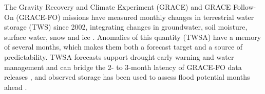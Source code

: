 \documentclass[hess, manuscript]{copernicus}
\begin{document}
\begin{abstract}
differ significantly from the filter's. None of the nonlinear models
tested on the same inputs has lower error than this ridge at 1 to 3
months. Both the filter and damped persistence have lower
standardized error at 1 month than GRACE-FCast, a published deep-learning
hindcast, when each is scored on the same mascon product and on the fully
covered basins. GRACE-FCast has significantly lower error than the filter
from 3 to 5 months onward, depending on product and variant. We therefore
recommend scoring storage forecasts against a filtered reference and
reporting their errors in physical as well as standardized units.
\end{abstract}

\introduction
\label{sec:intro}

The Gravity Recovery and Climate Experiment (GRACE) and GRACE Follow-On
(GRACE-FO) missions have measured monthly changes in
terrestrial water storage (TWS) since 2002, integrating changes in groundwater,
soil moisture, surface water, snow and ice \citep{tapley2004grace, landerer2020gracefo}.
Anomalies of this quantity (TWSA) have a memory of several months, which
makes them both a forecast target and a source of predictability. TWSA
forecasts support drought early warning and water management
\citep{li2026fldas, arsenault2020nhyfas} and can bridge the 2- to 3-month
latency of GRACE-FO data releases \citep{mo2025nrt, li2026fcast}, and
observed storage has been used to assess flood potential months ahead
\citep{reager2014flood}.
\end{document}

